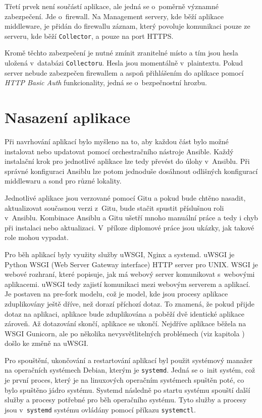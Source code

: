 \documentclass[thesis=M,czech]{src/FITthesis}[2019/12/23]
\begin{document}
Třetí prvek není součástí aplikace, ale jedná se o~poměrně významné zabezpečení. Jde o~firewall. Na Management servery, kde běží aplikace \linebreak middleware, je přidán do firewallu záznam, který povoluje komunikaci pouze ze serveru, kde běží \texttt{Collector}, a pouze na port HTTPS.

Kromě těchto zabezpečení je nutné zmínit zranitelné místo a tím jsou hesla uložená v~databázi \texttt{Collectoru}. Hesla jsou momentálně v~plaintextu. Pokud server nebude zabezpečen firewallem a aspoň přihlášením do aplikace pomocí \textit{HTTP Basic Auth} funkcionality, jedná se o~bezpečnostní hrozbu. 
\section{Nasazení aplikace}
Při navrhování aplikací bylo myšleno na to, aby každou část bylo možné instalovat nebo updatovat pomocí orchestračního nástroje Ansible. Každý instalační krok pro jednotlivé aplikace lze tedy převést do úlohy v~Ansiblu. Při správné konfiguraci Ansiblu lze potom jednoduše dosáhnout odlišných konfigurací middlewaru a sond pro různé lokality. 

Jednotlivé aplikace jsou verzované pomocí Gitu a pokud bude chtěno nasadit, aktualizovat   současnou verzi z~Gitu, bude stačit spustit příslušnou roli v~Ansiblu. Kombinace Ansiblu a Gitu ušetří mnoho manuální práce a tedy i chyb při instalaci nebo aktualizaci. V~příloze diplomové práce jsou ukázky, jak takové role mohou vypadat.


Pro běh aplikací byly využity služby uWSGI, Nginx a systemd. uWSGI je Python WSGI  (Web Server Gateway interface) HTTP server pro UNIX. WSGI je webové rozhraní, které popisuje, jak má webový server komunikovat s~webovými aplikacemi. uWSGI tedy zajistí komunikaci mezi webovým serverem a aplikací. Je postaven na pre-fork modelu, což je model, kde jsou procesy aplikace zduplikovány ještě dříve, než dorazí příchozí dotaz. To znamená, že pokud přijde dotaz na aplikaci, aplikace bude zduplikována a poběží dvě identické aplikace zároveň. Až dotazování skončí, aplikace se ukončí. Nejdříve aplikace běžela na WSGI Gunicorn, ale po několika nevysvětlitelných problémech (viz kapitola ) došlo ke změně na uWSGI. \cite{django, wsgi}


Pro spouštění, ukončování a restartování aplikací byl použit systémový manažer na operačních systémech Debian, kterým je \texttt{systemd}. Jedná se o~init systém, což je první proces, který je na linuxových operačním systémech spuštěn poté, co bylo spuštěno jádro systému. Systemd následně po startu systému spouští další služby a procesy potřebné pro běh operačního systému. Tyto služby a procesy jsou v~\texttt{systemd} systému ovládány pomocí příkazu \texttt{systemctl}. \cite{init-system}
\end{document}
